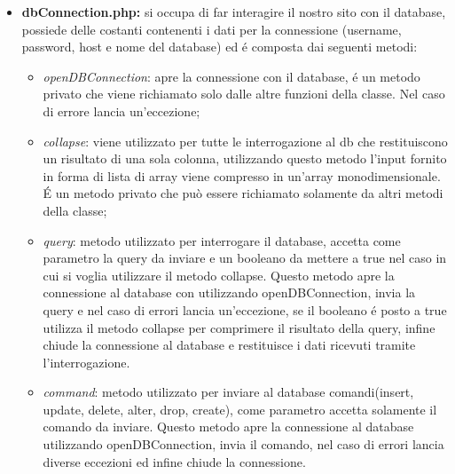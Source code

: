 \begin{itemize}
\begin{itemize}
		\item \textit{makeAccessdenied}: costruisce una pagina di errore nel caso in cui l'utente non abbia i permessi di vedere una determinata pagina.
		\item \textit{userInfo}: metodo utilizzato da dettagli account, costruisce una lista con tutte le informazioni dell'account in cui si é loggati.
	\end{itemize}
\item \textbf{dbConnection.php:} si occupa di far interagire il nostro sito con il database, possiede delle costanti contenenti i dati per la connessione (username, password, host e nome del database) ed é composta dai seguenti metodi:
	\begin{itemize}
		\item \textit{openDBConnection}: apre la connessione con il database, é un metodo privato che viene richiamato solo dalle altre funzioni della classe. Nel caso di errore lancia un'eccezione;
		\item \textit{collapse}: viene utilizzato per tutte le interrogazione al db che restituiscono un risultato di una sola colonna, utilizzando questo metodo l'input fornito in forma di lista di array viene compresso in un'array monodimensionale. \'E un metodo privato che può essere richiamato solamente da altri metodi della classe;
		\item \textit{query}: metodo utilizzato per interrogare il database, accetta come parametro la query da inviare e un booleano da mettere a true nel caso in cui si voglia utilizzare il metodo collapse. Questo metodo apre la connessione al database con utilizzando openDBConnection, invia la query e nel caso di errori lancia un'eccezione, se il booleano é posto a true utilizza il metodo collapse per comprimere il risultato della query, infine chiude la connessione al database e restituisce i dati ricevuti tramite l'interrogazione.
		\item \textit{command}: metodo utilizzato per inviare al database comandi(insert, update, delete, alter, drop, create), come parametro accetta solamente il comando da inviare. Questo metodo apre la connessione al database utilizzando openDBConnection, invia il comando, nel caso di errori lancia diverse eccezioni ed infine chiude la connessione.
	\end{itemize}
\end{itemize}
